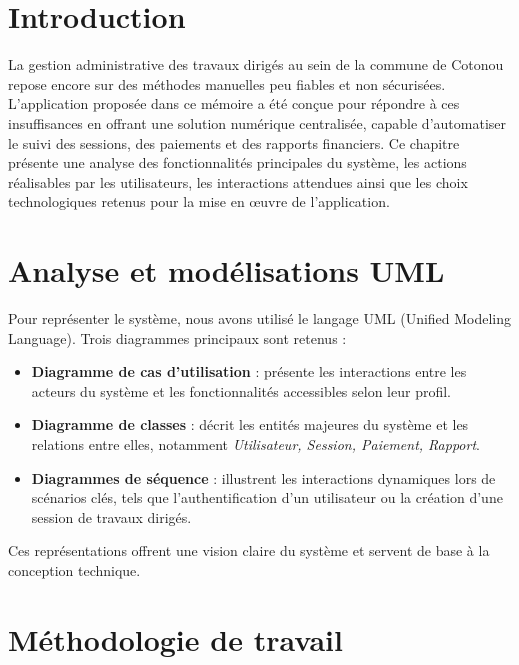 \section*{Introduction}

La gestion administrative des travaux dirigés au sein de la commune de 
Cotonou repose encore sur des méthodes manuelles peu fiables et non 
sécurisées. L'application proposée dans ce mémoire a été conçue pour 
répondre à ces insuffisances en offrant une solution numérique centralisée, 
capable d'automatiser le suivi des sessions, des paiements et des rapports 
financiers. Ce chapitre présente une analyse des fonctionnalités principales 
du système, les actions réalisables par les utilisateurs, les interactions 
attendues ainsi que les choix technologiques retenus pour la mise en œuvre 
de l'application.

\section{Analyse et modélisations UML}

Pour représenter le système, nous avons utilisé le langage UML 
(Unified Modeling Language). Trois diagrammes principaux sont retenus :

\begin{itemize}
    \item \textbf{Diagramme de cas d'utilisation} : présente les 
    interactions entre les acteurs du système et les fonctionnalités 
    accessibles selon leur profil.

    \item \textbf{Diagramme de classes} : décrit les entités majeures 
    du système et les relations entre elles, notamment 
    \textit{Utilisateur, Session, Paiement, Rapport}.

    \item \textbf{Diagrammes de séquence} : illustrent les interactions 
    dynamiques lors de scénarios clés, tels que l'authentification d'un 
    utilisateur ou la création d'une session de travaux dirigés.
\end{itemize}

Ces représentations offrent une vision claire du système et servent de 
base à la conception technique.

\section{Méthodologie de travail}

